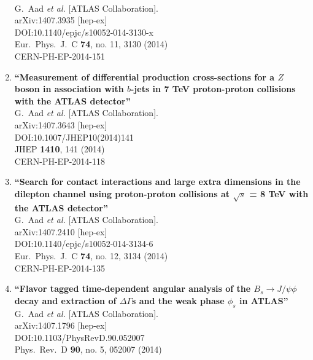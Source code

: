 \documentclass{article}
\begin{document}
\begin{enumerate}
  \\{}G.~Aad {\it et al.} [ATLAS Collaboration].
  \\{}arXiv:1407.3935 [hep-ex]
  \\{}DOI:10.1140/epjc/s10052-014-3130-x
  \\{}Eur.\ Phys.\ J.\ C {\bf 74}, no. 11, 3130 (2014)
  \\{}CERN-PH-EP-2014-151
\item%
{\bf ``Measurement of differential production cross-sections for a $Z$ boson in association with $b$-jets in 7 TeV proton-proton collisions with the ATLAS detector''}
  \\{}G.~Aad {\it et al.} [ATLAS Collaboration].
  \\{}arXiv:1407.3643 [hep-ex]
  \\{}DOI:10.1007/JHEP10(2014)141
  \\{}JHEP {\bf 1410}, 141 (2014)
  \\{}CERN-PH-EP-2014-118
\item%
{\bf ``Search for contact interactions and large extra dimensions in the dilepton channel using proton-proton collisions at $\sqrt{s}$ = 8 TeV with the ATLAS detector''}
  \\{}G.~Aad {\it et al.} [ATLAS Collaboration].
  \\{}arXiv:1407.2410 [hep-ex]
  \\{}DOI:10.1140/epjc/s10052-014-3134-6
  \\{}Eur.\ Phys.\ J.\ C {\bf 74}, no. 12, 3134 (2014)
  \\{}CERN-PH-EP-2014-135
\item%
{\bf ``Flavor tagged time-dependent angular analysis of the $B_s \rightarrow J/\psi \phi$ decay and extraction of $\Delta\Gamma$s and the weak phase $\phi_s$ in ATLAS''}
  \\{}G.~Aad {\it et al.} [ATLAS Collaboration].
  \\{}arXiv:1407.1796 [hep-ex]
  \\{}DOI:10.1103/PhysRevD.90.052007
  \\{}Phys.\ Rev.\ D {\bf 90}, no. 5, 052007 (2014)

\end{enumerate}
\end{document}
